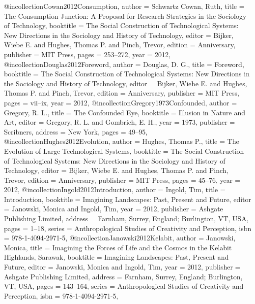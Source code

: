 @incollection{Cowan2012Consumption,
  author    = {Schwartz Cowan, Ruth},
  title     = {{The Consumption Junction: A Proposal for Research Strategies in the Sociology of Technology}},
  booktitle = {{The Social Construction of Technological Systems: New Directions in the Sociology and History of Technology}},
  editor    = {Bijker, Wiebe E. and Hughes, Thomas P. and Pinch, Trevor},
  edition   = {Anniversary},
  publisher = {MIT Press},
  pages     = {253--272},
  year      = {2012},
}
@incollection{Douglas2012Foreword,
  author    = {Douglas, D. G.},
  title     = {{Foreword}},
  booktitle = {{The Social Construction of Technological Systems: New Directions in the Sociology and History of Technology}},
  editor    = {Bijker, Wiebe E. and Hughes, Thomas P. and Pinch, Trevor},
  edition   = {Anniversary},
  publisher = {MIT Press},
  pages     = {vii--ix},
  year      = {2012},
}
@incollection{Gregory1973Confounded,
  author  = {Gregory, R. L.},
  title   = {{The Confounded Eye}},
  booktitle = {{Illusion in Nature and Art}},
  editor  = {Gregory, R. L. and Gombrich, E. H.},
  year    = {1973},
  publisher = {Scribners},
  address = {New York},
  pages   = {49--95},
}
@incollection{Hughes2012Evolution,
  author    = {Hughes, Thomas P.},
  title     = {{The Evolution of Large Technological Systems}},
  booktitle = {{The Social Construction of Technological Systems: New Directions in the Sociology and History of Technology}},
  editor    = {Bijker, Wiebe E. and Hughes, Thomas P. and Pinch, Trevor},
  edition   = {Anniversary},
  publisher = {MIT Press},
  pages     = {45--76},
  year      = {2012},
}
@incollection{Ingold2012Introduction,
  author    = {Ingold, Tim},
  title     = {{Introduction}},
  booktitle = {{Imagining Landscapes: Past, Present and Future}},
  editor    = {Janowski, Monica and Ingold, Tim},
  year      = {2012},
  publisher = {Ashgate Publishing Limited},
  address   = {Farnham, Surrey, England; Burlington, VT, USA},
  pages     = {1--18},
  series    = {Anthropological Studies of Creativity and Perception},
  isbn      = {978-1-4094-2971-5},
}
@incollection{Janowski2012Kelabit,
  author    = {Janowski, Monica},
  title     = {{Imagining the Forces of Life and the Cosmos in the Kelabit Highlands, Sarawak}},
  booktitle = {{Imagining Landscapes: Past, Present and Future}},
  editor    = {Janowski, Monica and Ingold, Tim},
  year      = {2012},
  publisher = {Ashgate Publishing Limited},
  address   = {Farnham, Surrey, England; Burlington, VT, USA},
  pages     = {143--164},
  series    = {Anthropological Studies of Creativity and Perception},
  isbn      = {978-1-4094-2971-5},
}
